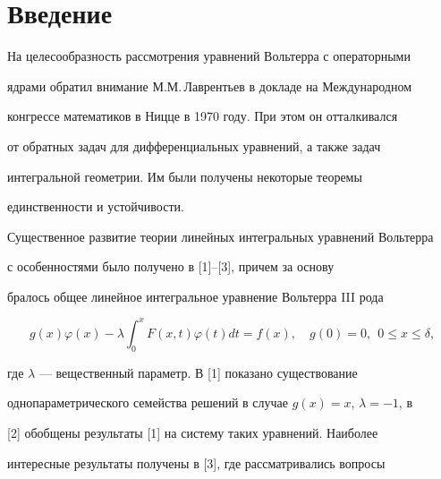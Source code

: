  




\maketitle 


\label{begin} 


 


 


\section*{Введение} 


 


 


На целесообразность рассмотрения уравнений Вольтерра с операторными 


ядрами обратил внимание М.М.\,Лаврентьев в докладе на Международном 


конгрессе математиков в Ницце в 1970 году. При этом он отталкивался 


от обратных задач для дифференциальных уравнений, а также задач 


интегральной геометрии. Им были получены некоторые теоремы 


единственности и устойчивости. 


 


Существенное развитие теории линейных интегральных уравнений Вольтерра 


с особенностями было получено в [1]--[3], причем за основу 


бралось общее линейное интегральное уравнение Вольтерра III рода 


$$ 


g(x)\varphi(x)-\lambda\int^x_0 F(x,t)\varphi(t)dt=f(x), 


\quad g(0)=0,\ \ 0\le x\le\delta, 


$$ 


где $\lambda$ --- вещественный параметр. В [1] показано существование 


однопараметрического семейства решений в случае $g(x)=x$, $\lambda=-1$, в 


[2] обобщены результаты [1] на систему таких уравнений. Наиболее 


интересные результаты получены в [3], где рассматривались вопросы 


